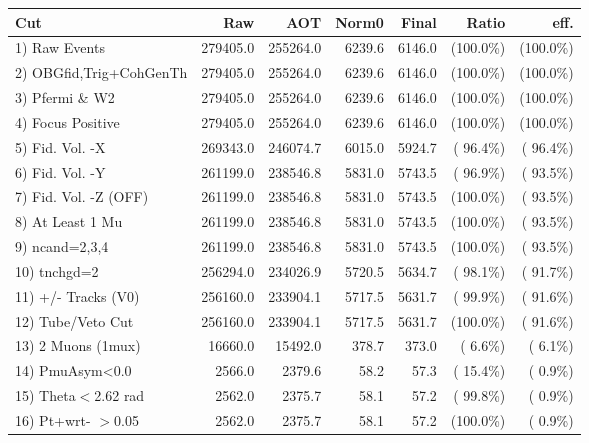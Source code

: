  \begin{table}[h!]\centering
 \begin{tabular}{||l||r|r|r|r|r|r||}
 \hline
 \hline
 Cut & Raw & AOT & Norm0 & Final & Ratio & eff.       \\
 \hline
  1) Raw Events           &     279405.0 &     255264.0 &       6239.6 &       6146.0 & (100.0\%) & (100.0\%) \\
  2) OBGfid,Trig+CohGenTh &     279405.0 &     255264.0 &       6239.6 &       6146.0 & (100.0\%) & (100.0\%) \\
  3) Pfermi \& W2         &     279405.0 &     255264.0 &       6239.6 &       6146.0 & (100.0\%) & (100.0\%) \\
  4) Focus Positive       &     279405.0 &     255264.0 &       6239.6 &       6146.0 & (100.0\%) & (100.0\%) \\
  5) Fid. Vol. -X         &     269343.0 &     246074.7 &       6015.0 &       5924.7 & ( 96.4\%) & ( 96.4\%) \\
  6) Fid. Vol. -Y         &     261199.0 &     238546.8 &       5831.0 &       5743.5 & ( 96.9\%) & ( 93.5\%) \\
  7) Fid. Vol. -Z (OFF)   &     261199.0 &     238546.8 &       5831.0 &       5743.5 & (100.0\%) & ( 93.5\%) \\
  8) At Least 1 Mu        &     261199.0 &     238546.8 &       5831.0 &       5743.5 & (100.0\%) & ( 93.5\%) \\
  9) ncand=2,3,4          &     261199.0 &     238546.8 &       5831.0 &       5743.5 & (100.0\%) & ( 93.5\%) \\
 10) tnchgd=2             &     256294.0 &     234026.9 &       5720.5 &       5634.7 & ( 98.1\%) & ( 91.7\%) \\
 11) +/- Tracks (V0)      &     256160.0 &     233904.1 &       5717.5 &       5631.7 & ( 99.9\%) & ( 91.6\%) \\
 12) Tube/Veto Cut        &     256160.0 &     233904.1 &       5717.5 &       5631.7 & (100.0\%) & ( 91.6\%) \\
 13) 2 Muons (1mux)       &      16660.0 &      15492.0 &        378.7 &        373.0 & (  6.6\%) & (  6.1\%) \\
 14) PmuAsym<0.0          &       2566.0 &       2379.6 &         58.2 &         57.3 & ( 15.4\%) & (  0.9\%) \\
 15) Theta$<$2.62 rad     &       2562.0 &       2375.7 &         58.1 &         57.2 & ( 99.8\%) & (  0.9\%) \\
 16) Pt+wrt- $>$0.05      &       2562.0 &       2375.7 &         58.1 &         57.2 & (100.0\%) & (  0.9\%) \\

\end{tabular}
\end{table}
